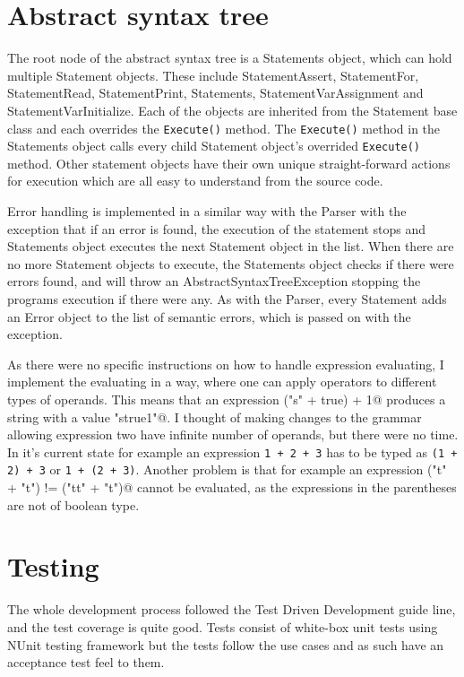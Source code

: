 \documentclass[a4paper,12pt]{article}
\newcommand{\ttt}[1]{\texttt{#1}}
\begin{document}
\section{Abstract syntax tree}
The root node of the abstract syntax tree is a Statements object, which can hold
multiple Statement objects. These include StatementAssert, StatementFor,
StatementRead, StatementPrint, Statements, StatementVarAssignment and
StatementVarInitialize. Each of the objects are inherited from the Statement
base class and each overrides the \ttt{Execute()} method. The \ttt{Execute()}
method in the Statements object calls every child Statement object's overrided
\ttt{Execute()} method. Other statement objects have their own unique
straight-forward actions for execution which are all easy to understand from the
source code.

Error handling is implemented in a similar way with the Parser with the
exception that if an error is found, the execution of the statement stops and
Statements object executes the next Statement object in the list. When there
are no more Statement objects to execute, the Statements object checks if there
were errors found, and will throw an AbstractSyntaxTreeException stopping the
programs execution if there were any. As with the Parser, every Statement adds
an Error object to the list of semantic errors, which is passed on with the
exception.

As there were no specific instructions on how to handle expression evaluating, I
implement the evaluating in a way, where one can apply operators to different
types of operands. This means that an expression \verb@("s" + true) + 1@
produces a string with a value \verb@"strue1"@. I thought of making changes to
the grammar allowing expression two have infinite number of operands, but there
were no time. In it's current state for example an expression \ttt{1 + 2 + 3}
has to be typed as \ttt{(1 + 2) + 3} or \ttt{1 + (2 + 3)}. Another problem is
that for example an expression \verb@("t" + "t") != ("tt" + "t")@ cannot be
evaluated, as the expressions in the parentheses are not of boolean type.

\section{Testing}
The whole development process followed the Test Driven Development guide line,
and the test coverage is quite good. Tests consist of white-box unit tests using
NUnit testing framework but the tests follow the use cases and as such have an
acceptance test feel to them.
\end{document}
